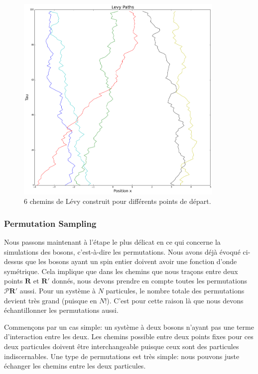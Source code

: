 \documentclass[11pt]{article}
\theoremstyle{definition}
\theoremstyle{remark}
\begin{document}
\begin{figure}[!h]
\label{levy_paths}
\centering 
\includegraphics[width=10cm]{levy_paths.png}
\caption{6 chemins de Lévy construit pour différents points de départ.}
\end{figure} 

\subsubsection{Permutation Sampling} 

Nous passons maintenant à l’étape le plus délicat en ce qui concerne la simulations des bosons, c'est-à-dire les permutations. Nous avons déjà évoqué ci-dessus que les bosons ayant un spin entier doivent avoir une fonction d'onde symétrique. Cela implique que dans les chemins que nous traçons entre deux points $\mathbf{R}$ et $\mathbf{R'}$ donnés, nous devons prendre en compte toutes les permutations $\mathcal{P}\mathbf{R}'$ aussi. Pour un système à $N$ particules, le nombre totale des permutations devient très grand (puisque en $N!$). C'est pour cette raison là que nous devons échantillonner les permutations aussi. 

Commençons par un cas simple: un système à deux bosons n'ayant pas une terme d'interaction entre les deux. Les chemins possible entre deux points fixes pour ces deux particules doivent être interchangeable puisque ceux sont des particules indiscernables. Une type de permutations est très simple: nous pouvons juste échanger les chemins entre les deux particules. 
\end{document}
